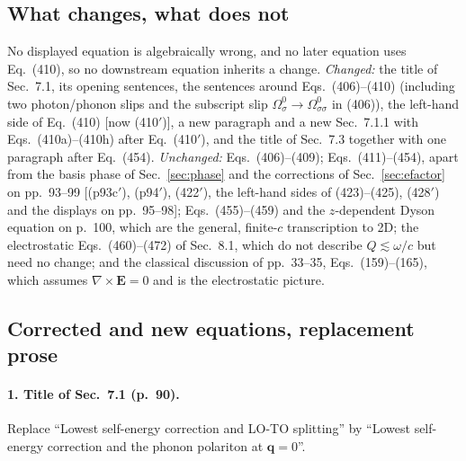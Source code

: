 \documentclass[11pt]{article}
\begin{document}
\subsection{What changes, what does not}
No displayed equation is algebraically wrong, and no later equation uses Eq.~(410), so no downstream
equation inherits a change. \emph{Changed:} the title of Sec.~7.1, its opening sentences, the sentences
around Eqs.~(406)--(410) (including two photon/phonon slips and the subscript slip
$\Omega^0_\sigma\to\Omega^0_{\sigma\sigma}$ in (406)), the left-hand side of Eq.~(410) [now (410$'$)], a new
paragraph and a new Sec.~7.1.1 with Eqs.~(410a)--(410h) after Eq.~(410$'$), and the title of Sec.~7.3
together with one paragraph after Eq.~(454). \emph{Unchanged:} Eqs.~(406)--(409); Eqs.~(411)--(454),
apart from the basis phase of Sec.~\ref{sec:phase} and the corrections of Sec.~\ref{sec:efactor} on
pp.~93--99 [(p93c$'$), (p94$'$), (422$'$), the left-hand sides of (423)--(425), (428$'$) and the displays on
pp.~95--98]; Eqs.~(455)--(459) and the $z$-dependent Dyson
equation on p.~100, which are the general, finite-$c$ transcription to 2D; the electrostatic
Eqs.~(460)--(472) of Sec.~8.1, which do not describe $Q\lesssim\omega/c$ but need no change; and the
classical discussion of pp.~33--35, Eqs.~(159)--(165), which assumes $\nabla\times\mathbf E=0$ and is the
electrostatic picture.

\subsection{Corrected and new equations, replacement prose}
\paragraph{1. Title of Sec.~7.1 (p.~90).}
Replace ``Lowest self-energy correction and LO-TO splitting'' by ``Lowest self-energy correction and the
phonon polariton at $\mathbf q=0$''.
\end{document}
